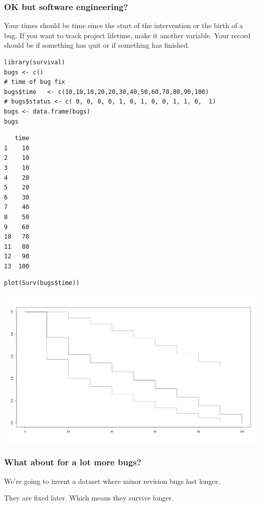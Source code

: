 \documentclass[11pt]{article}
\begin{document}
\subsubsection{OK but software engineering?}
\label{sec:org982bf54}

Your times should be time since the start of the intervention or the
birth of a bug. If you want to track project lifetime, make it another
variable. Your record should be if something has quit or if something
has finished.

\begin{verbatim}
library(survival)
bugs <- c()
# time of bug fix
bugs$time   <- c(10,10,10,20,20,30,40,50,60,70,80,90,100)
# bugs$status <- c( 0, 0, 0, 0, 1, 0, 1, 0, 0, 1, 1, 0,  1)
bugs <- data.frame(bugs)
bugs
\end{verbatim}

\begin{verbatim}
   time
1    10
2    10
3    10
4    20
5    20
6    30
7    40
8    50
9    60
10   70
11   80
12   90
13  100
\end{verbatim}

\begin{verbatim}
plot(Surv(bugs$time))
\end{verbatim}

\begin{center}
\includegraphics[width=.9\linewidth]{Bugs.png}
\end{center}

\subsubsection{What about for a lot more bugs?}
\label{sec:org4d521d7}

We're going to invent a dataset where minor revision bugs last longer.

They are fixed later. Which means they survive longer.
\end{document}
